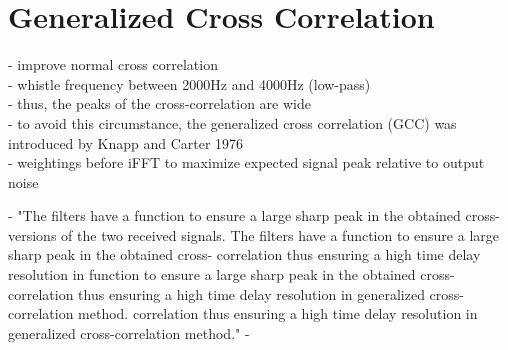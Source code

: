 \section{Generalized Cross Correlation}

- improve normal cross correlation\\
- whistle frequency between 2000Hz and 4000Hz (low-pass)\\
- thus, the peaks of the cross-correlation are wide\\
- to avoid this circumstance, the generalized cross correlation (GCC)
was introduced by Knapp and Carter 1976 \cite{Knapp_Carter_GCC} \\
- weightings before iFFT to maximize expected signal peak relative
to output noise \cite{Hassab_Boucher_GCC}


- 
"The filters have a function to ensure a large sharp peak in the obtained cross-versions of the two received signals. The filters have a function to ensure a large sharp peak in the obtained cross- correlation thus ensuring a high time delay resolution in
function to ensure a large sharp peak in the obtained cross- correlation thus ensuring a high time delay resolution in generalized cross-correlation method.
correlation thus ensuring a high time delay resolution in generalized cross-correlation method." - 